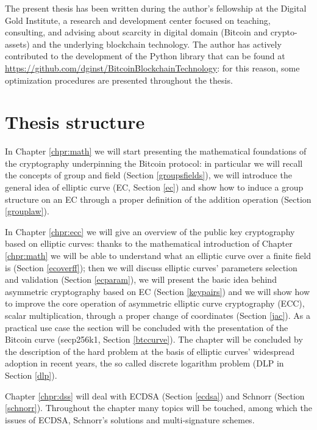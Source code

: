 \bigskip
\noindent
The present thesis has been written during the author's fellowship at the Digital Gold Institute, a research and development center focused on teaching, consulting, and advising about scarcity in digital domain (Bitcoin and crypto-assets) and the underlying blockchain technology. The author has actively contributed to the development of the Python library that can be found at \url{https://github.com/dginst/BitcoinBlockchainTechnology}: for this reason, some optimization procedures are presented throughout the thesis.

\bigskip

\bigskip

\section{Thesis structure}
In Chapter \ref{chpr:math} we will start presenting the mathematical foundations of the cryptography underpinning the Bitcoin protocol: in particular we will recall the concepts of group and field (Section \ref{groupsfields}), we will introduce the general idea of elliptic curve (EC, Section \ref{ec}) and show how to induce a group structure on an EC through a proper definition of the addition operation (Section \ref{grouplaw}).

\bigskip
\noindent
In Chapter \ref{chpr:ecc} we will give an overview of the public key cryptography based on elliptic curves: thanks to the mathematical introduction of Chapter \ref{chpr:math} we will be able to understand what an elliptic curve over a finite field is (Section \ref{ecoverff}); then we will discuss elliptic curves' parameters selection and validation (Section \ref{ecparam}), we will present the basic idea behind asymmetric cryptography based on EC (Section \ref{keypairs}) and we will show how to improve the core operation of asymmetric elliptic curve cryptography (ECC), scalar multiplication, through a proper change of coordinates (Section \ref{jac}). As a practical use case the section will be concluded with the presentation of the Bitcoin curve (secp256k1, Section \ref{btccurve}). The chapter will be concluded by the description of the hard problem at the basis of elliptic curves' widespread adoption in recent years, the so called discrete logarithm problem (DLP in Section \ref{dlp}).

\bigskip
\noindent
Chapter \ref{chpr:dss} will deal with ECDSA (Section \ref{ecdsa}) and Schnorr (Section \ref{schnorr}). Throughout the chapter many topics will be touched, among which the issues of ECDSA, Schnorr's solutions and multi-signature schemes.

